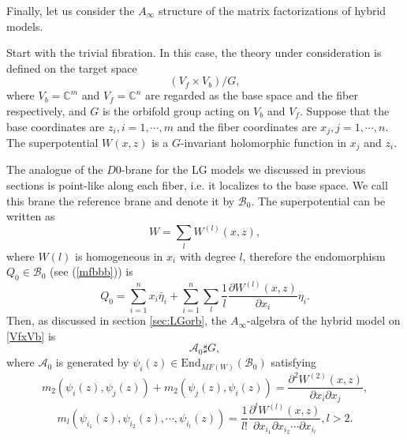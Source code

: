 \documentclass[a4paper,11pt]{article}
\numberwithin{equation}{section}
\begin{document}
Finally, let us consider the $A_\infty$ structure of the matrix factorizations 
of hybrid models.

Start with the trivial fibration. In this case, the theory under 
consideration is defined on the target space
\begin{equation}\label{VfxVb}
(V_f \times V_b) / G,
\end{equation}
where $V_b = \mathbb{C}^m$ and $V_f = \mathbb{C}^n$ are regarded as the base space and the fiber respectively, and $G$ is the orbifold group acting on $V_b$ and $V_f$. 
Suppose that the base coordinates are $z_i, i=1,\cdots,m$ and the fiber coordinates are $x_j, j=1,\cdots,n$. The superpotential $W(x,z)$ is a $G$-invariant holomorphic function in $x_j$ and $z_i$.

The analogue of the $D0$-brane for the LG models we discussed in previous sections is point-like along each fiber, i.e. it localizes to the base space. We call this brane the reference brane and denote it by $\mathcal{B}_0$. The superpotential can be written as
\[
W = \sum_{l} W^{(l)}(x,z),
\]
where $W{(l)}$ is homogeneous in $x_i$ with degree $l$, therefore the 
endomorphism $Q_{0}\in \mathcal{B}_0$ (see (\ref{mfbbb})) is
\[
Q_0 = \sum_{i=1}^n x_i \bar{\eta}_i + \sum_{i=1}^n \sum_l \frac{1}{l} \frac{\partial W^{(l)}(x,z)}{\partial x_i} \eta_i.
\]
Then, as discussed in section \ref{sec:LGorb}, the $A_\infty$-algebra of the hybrid model on \eqref{VfxVb} is
\[
\mathcal{A}_0 \sharp G,
\]
where $\mathcal{A}_0$ is generated by $\psi_i(z) \in \mathrm{End}_{MF(W)}(\mathcal{B}_0)$ satisfying
\[
m_2 (\psi_i(z),\psi_j(z)) + m_2(\psi_j(z),\psi_i(z)) = \frac{\partial^2 W^{(2)}(x,z)}{\partial 
x_i \partial x_j}, \]
\[
m_l (\psi_{i_1}(z),\psi_{i_2}(z),\cdots,\psi_{i_l}(z)) = \frac{1}{l!} \frac{\partial^l 
W^{(l)}(x,z)}{\partial x_{i_1} \partial x_{i_2} \cdots \partial x_{i_l}}, l>2.
\]
\end{document}
